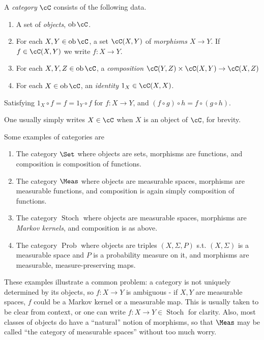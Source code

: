\documentclass{article}
\DeclareMathOperator{\ob}{ob}
\DeclareMathOperator{\Stoch}{Stoch}
\DeclareMathOperator{\Prob}{Prob}
\begin{document}
\begin{definition}
    A \emph{category} $\cC$ consists of the following data.
    \begin{enumerate}
        \item A set of \emph{objects}, $\ob \cC$.
        \item For each $X,Y \in \ob \cC$, a set $\cC(X,Y)$ of \emph{morphisms $X \to Y$}. If $f\in \cC(X,Y)$ we write $f: X \to Y$.
        \item For each $X,Y,Z \in \ob \cC$, a \emph{composition} $\cC(Y,Z) \times \cC(X,Y) \to \cC(X,Z)$
        \item For each $X \in \ob \cC$, an \emph{identity} $1_X \in \cC(X,X)$.
    \end{enumerate}
    Satisfying $1_X \circ f = f = 1_Y \circ f$ for $f: X \to Y$, and $(f\circ g)\circ h = f \circ (g \circ h)$.
\end{definition}
One usually simply writes $X \in \cC$ when $X$ is an object of $\cC$, for brevity.
\begin{example}
    Some examples of categories are
    \begin{enumerate}
        \item The category $\Set$ where objects are sets, morphisms are functions, and composition is composition of functions.
        \item The category $\Meas$ where objects are measurable spaces, morphisms are measurable functions, and composition is again simply composition of functions.
        \item The category $\Stoch$ where objects are measurable spaces, morphisms are \emph{Markov kernels}, and composition is as above.
        \item The category $\Prob$ where objects are triples $(X,\Sigma,P)$ s.t. $(X,\Sigma)$ is a measurable space and $P$ is a probability measure on it, and morphisms are measurable, measure-preserving maps.
    \end{enumerate}
\end{example}
These examples illustrate a common problem: a category is not uniquely determined by its objects, so $f:X \to Y$ is ambiguous - if $X,Y$ are measurable spaces, $f$ could be a Markov kernel or a measurable map. This is usually taken to be clear from context, or one can write $f:X \to Y \in \Stoch$ for clarity.
Also, most classes of objects do have a ``natural'' notion of morphisms, so that $\Meas$ may be called ``the category of measurable spaces'' without too much worry.
\end{document}
